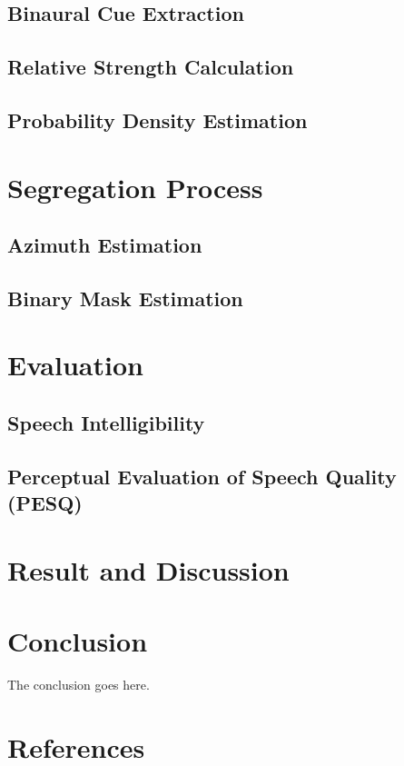 \documentclass[a4paper]{jpconf}
\begin{document}
\subsection{Binaural Cue Extraction}

\subsection{Relative Strength Calculation}

\subsection{Probability Density Estimation}

\section{Segregation Process}
\subsection{Azimuth Estimation}

\subsection{Binary Mask Estimation}

\section{Evaluation}
\subsection{Speech Intelligibility}

\subsection{Perceptual Evaluation of Speech Quality (PESQ)}

\section{Result and Discussion}
\section{Conclusion}
The conclusion goes here.


\section*{References}

\begin{thebibliography}{9}
\end{thebibliography}
\end{document}

